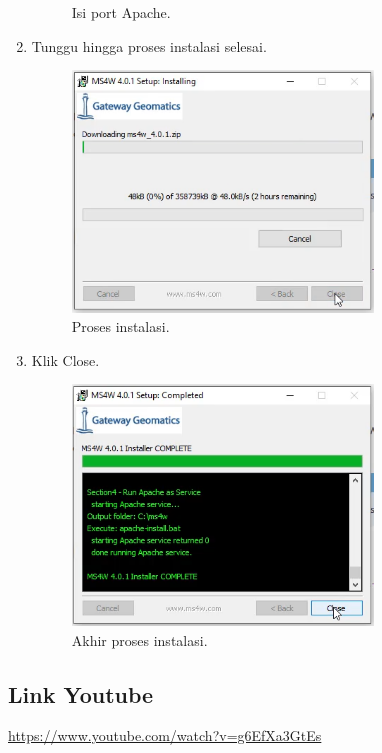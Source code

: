 \begin{enumerate}
\begin{figure}[H]
		\centering
		\caption{Isi port Apache.}
	\end{figure}
	\item  Tunggu hingga proses instalasi selesai.
	\hfill\break
	\begin{figure}[H]
		\includegraphics[width=8cm]{figures/1174006/4/7.png}
		\centering
		\caption{Proses instalasi.}
	\end{figure}
	\item  Klik Close.
	\hfill\break
	\begin{figure}[H]
		\includegraphics[width=8cm]{figures/1174006/4/8.png}
		\centering
		\caption{Akhir proses instalasi.}
	\end{figure}
\end{enumerate}
\subsection{Link Youtube}
\href{https://www.youtube.com/watch?v=g6EfXa3GtEs}{https://www.youtube.com/watch?v=g6EfXa3GtEs}
